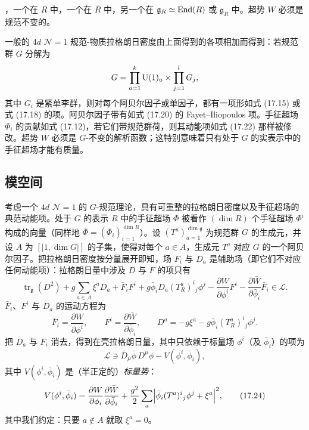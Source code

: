 ，一个在 $R$ 中，一个在 $\bar R$ 中，另一个在 $\mathfrak g_R\simeq\operatorname{End}(R)$ 或 $\mathfrak g_{\bar R}$ 中。超势 $W$ 必须是规范不变的。

\begin{definition}[17.26]
一般的 $4d$ $\mathcal{N}=1$ 规范-物质拉格朗日密度由上面得到的各项相加而得到：若规范群 $G$ 分解为
\[
G=\prod_{a=1}^{k}\operatorname{U}(1)_a\times\prod_{j=1}^{l}G_j,
\]
其中 $G_i$ 是紧单李群，则对每个阿贝尔因子或单因子，都有一项形如式 (17.15) 或式 (17.18) 的项。阿贝尔因子带有如式 (17.20) 的 Fayet--Iliopoulos 项。手征超场 $\Phi_i$ 的贡献如式 (17.12)，若它们带规范群荷，则其动能项如式 (17.22) 那样被修改。超势 $W$ 必须是 $G$-不变的解析函数；这特别意味着只有处于 $G$ 的实表示中的手征超场才能有质量。
\end{definition}

\subsection{模空间}

考虑一个 $4d$ $\mathcal{N}=1$ 的 $G$-规范理论，具有可重整的拉格朗日密度以及手征超场的典范动能项。处于 $G$ 的表示 $R$ 中的手征超场 $\Phi$ 被看作 $(\dim R)$ 个手征超场 $\Phi^i$ 构成的向量（同样地 $\bar\Phi=(\bar\Phi_i)_{i=1}^{\dim R}$）。设 $(T^a)_{a=1}^{\dim\mathfrak g}$ 为规范群 $G$ 的生成元，并设 $A$ 为 $[|1,\dim G|]$ 的子集，使得对每个 $a\in A$，生成元 $T^a$ 对应 $G$ 的一个阿贝尔因子。把拉格朗日密度按分量展开即知，场 $F_i$ 与 $D_a$ 是辅助场（即它们不对应任何动能项）：拉格朗日量中涉及 $D$ 与 $F$ 的项只有
\[
\operatorname{tr}_{\mathfrak g}(D^2)+g\sum_{a\in A}\xi^a D_a+\bar F_i F^i+g\bar\phi_i D_a(T_R^a)^i{}_j\phi^j-\frac{\partial W}{\partial\phi^i}F^i-\frac{\partial\bar W}{\partial\bar\phi_i}\bar F_i\in\mathcal{L}.
\]
$\bar F_i$、$F^i$ 与 $D_a$ 的运动方程为
\[
\bar F_i=\frac{\partial W}{\partial\phi^i},\qquad F^i=\frac{\partial\bar W}{\partial\bar\phi_i},\qquad D^a=-g\xi^a-g\bar\phi_i(T_R^a)^i{}_j\phi^j.
\]
把 $D_a$ 与 $F_i$ 消去，得到在壳拉格朗日量，其中只依赖于标量场 $\phi^i$（及 $\bar\phi_i$）的项为
\[
\mathcal{L}\ni \bar D_\mu\bar\phi\,D^\mu\phi-V(\phi^i,\bar\phi_i),
\]
其中 $V(\phi^i,\bar\phi_i)$ 是（半正定的）\emph{标量势}：
\begin{equation}
V(\phi^i,\bar\phi_i)=\frac{\partial W}{\partial\phi_i}\frac{\partial\bar W}{\partial\bar\phi_i}+\frac{g^2}{2}\sum_a\Bigl|\bar\phi_i(T^a)^i{}_j\phi^j+\xi^a\Bigr|^2,
\tag{17.24}
\end{equation}
其中我们约定：只要 $a\notin A$ 就取 $\xi^a=0$。


